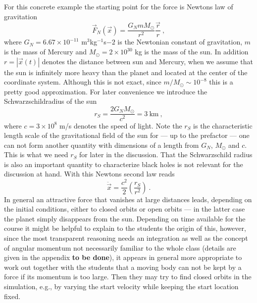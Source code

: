 \documentclass[12pt]{iopart}
\begin{document}
For this concrete example the starting point for the force is Newtons law
of gravitation
\begin{equation}
\vec F_N(\vec x) = \frac{G_N m M_\odot}{r^2} \frac{\vec r}{r}\ ,
\end{equation}
where $G_N=6.67\times 10^{-11}$ m$^3$kg$^{-1}$s${-2}$ is the Newtonian constant of gravitation,
$m$ is the mass of Mercury and $M_\odot=2\times 10^{30}$ kg is the mass of the sun.
In addition $r=|\vec x(t)|$ denotes the distance between sun and Mercury, when we assume that the sun
is infinitely more heavy than the planet and located at the center of the coordinate system. 
Although this is not exact, since $m/M_\odot\sim 10^{-8}$ this is
a pretty good approximation. For later convenience we introduce the Schwarzschildradius of the sun
\begin{equation}
r_S=\frac{2G_N  M_\odot}{c^2} = 3 \ \mbox{km} \ ,
\end{equation}
where $c=3\times 10^8$ m/s denotes the speed of light.
Note the $r_S$ is the characteristic length scale of the gravitational field of the sun
for --- up to the prefactor --- one can not form another quantity with dimensions of a length from $G_N$, $M_\odot$ and
$c$. This is what we need $r_S$ for later in the discussion. That the Schwarzschild radius is
also an important quantity to characterize black holes is not relevant for the discussion
at hand.
With this Newtons second law reads 
\begin{equation}
\ddot{\vec x} = \frac{c^2}{2}\left(\frac{r_S}{r^2}\right) \ .
\label{eq:newton}
\end{equation}
In general an attractive force that vanishes at large distances leads,
 depending on the initial conditions,
  either to closed orbits or open orbits --- 
  in the latter case the planet simply disappears from the sun. Depending on time available
for the course  it might be helpful to explain to the students the origin of this, however, since the most
transparent reasoning needs an integration as well as the concept of angular momentum
not necessarily familiar to the whole class (details are given in the appendix {\bf to be done}), 
it appears in general more appropriate to work out together with the students 
that a moving body can not be kept by a force if its momentum is too large.
 Then they may try to find closed orbits in the simulation, e.g., by varying
the start velocity while keeping the start location fixed.
\end{document}
